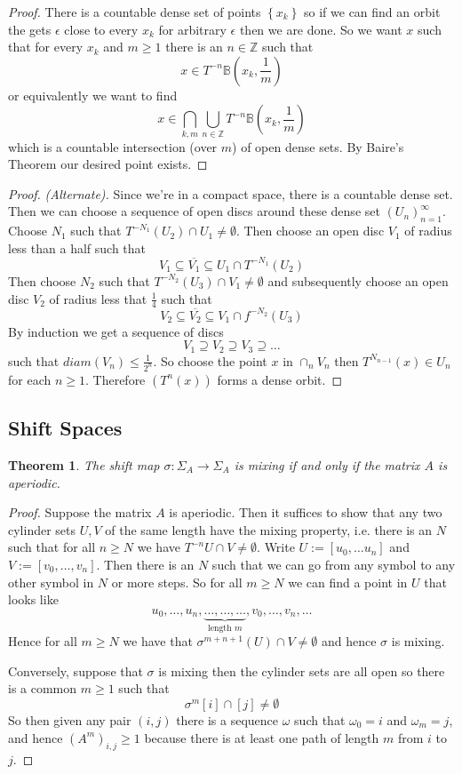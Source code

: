 \documentclass[11pt]{article}
\newcommand{\defeq}{:=}
\newcommand{\Z}{\mathbb{Z}}
\newtheorem{theorem}{Theorem}[section]
\begin{document}
\begin{proof}
There is a countable dense set of points $\left\{x_k\right\}$ so if we can find an orbit the gets $\epsilon$ close to every $x_k$ for arbitrary $\epsilon$ then we are done.
So we want $x$ such that for every $x_k$ and $m\geq 1$ there is an $n\in\Z$ such that
\[
	x\in T^{-n}\mathbb{B}\left(x_k,\frac{1}{m}\right)
\]
or equivalently we want to find
\[
	x\in\bigcap_{k, m}\bigcup_{n\in\Z}T^{-n}\mathbb{B}\left(x_k,\frac{1}{m}\right)
\]
which is a countable intersection (over $m$) of open dense sets.
By Baire's Theorem our desired point exists.
\end{proof}

\begin{proof}
\textit{(Alternate).}
Since we're in a compact space, there is a countable dense set.
Then we can choose a sequence of open discs around these dense set $(U_n)_{n=1}^\infty$.
Choose $N_1$ such that $T^{-N_1}(U_2)\cap U_1 \neq \emptyset$.
Then choose an open disc $V_1$ of radius less than a half such that 
\[
	V_1 \subseteq \overline{V_1}\subseteq U_1 \cap T^{-N_1}(U_2)
\]
Then choose $N_2$ such that $T^{-N_2}(U_3)\cap V_1\neq\emptyset$ and subsequently choose an open disc $V_2$ of radius less that $\frac{1}{4}$ such that
\[
	V_2\subseteq \overline{V_2} \subseteq V_1 \cap f^{-N_2}(U_3)
\]
By induction we get a sequence of discs
\[
V_1 \supseteq V_2 \supseteq V_3 \supseteq \dots
\]
such that $diam(V_n)\leq\frac{1}{2^n}$.
So choose the point $x$ in $\cap_{n}V_n$ then $T^{N_{n-1}}(x)\in U_n$ for each $n\geq 1$.
Therefore $(T ^n(x))$ forms a dense orbit.
\end{proof}
\subsection{Shift Spaces}
\begin{theorem}
The shift map $\sigma: \Sigma_A \to \Sigma_A$ is mixing if and only if the matrix $A$ is aperiodic.
\end{theorem}

\begin{proof}
Suppose the matrix $A$ is aperiodic.
Then it suffices to show that any two cylinder sets $U, V$ of the same length have the mixing property, i.e. there is an $N$ such that for all $n\geq N$ we have $T^{-n}U\cap V\neq \emptyset$.
Write $U\defeq [u_0, \dots u_n]$ and $V\defeq [v_0, \dots, v_n]$.
Then there is an $N$ such that we can go from any symbol to any other symbol in $N$ or more steps.
So for all $m\geq N$ we can find a point in $U$ that looks like
\[
	u_0, \dots, u_n, \underbrace{\dots, \dots, \dots}_{\text{length }m}, v_0, \dots, v_n, \dots
\]
Hence for all $m\geq N$ we have that $\sigma^{m+n+1}(U)\cap V\neq\emptyset$ and hence $\sigma$ is mixing.

Conversely, suppose that $\sigma$ is mixing then the cylinder sets are all open so there is a common $m\geq 1$ such that
\[
	\sigma^m [i] \cap [j]\neq\emptyset
\]
So then given any pair $(i,j)$ there is a sequence $\omega$ such that $\omega_0=i$ and $\omega_m=j$, and hence $(A^m)_{i,j}\geq 1$ because there is at least one path of length $m$ from $i$ to $j$.
\end{proof}
\end{document}

